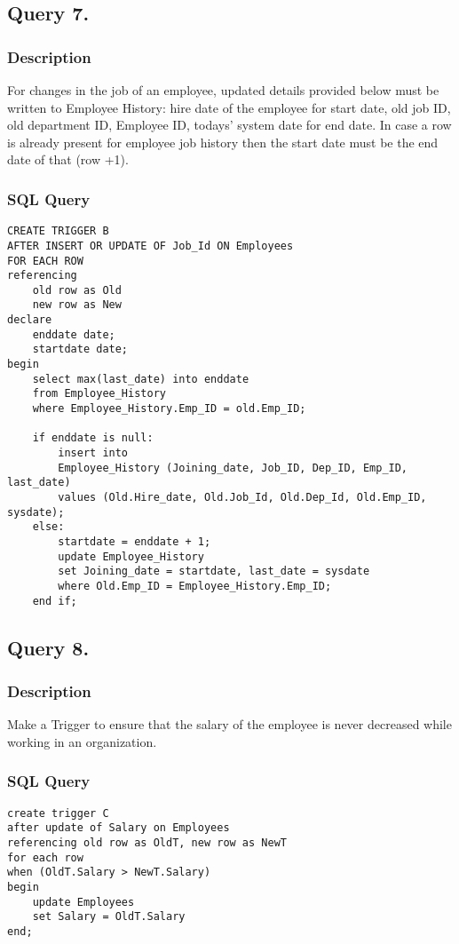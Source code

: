 \documentclass[a4paper]{article}
\begin{document}
\newpage
\subsection{Query 7.}
\subsubsection{Description}
For changes in the job of an employee, updated details provided below must be
written to Employee History:
hire date of the employee for start date, old job ID, old department ID,
Employee ID, todays' system date for end date. In case a row is already
present for employee job history then the start date must be the end date of that
(row +1).
\subsubsection{SQL Query}
\begin{lstlisting}
CREATE TRIGGER B
AFTER INSERT OR UPDATE OF Job_Id ON Employees
FOR EACH ROW
referencing
    old row as Old
    new row as New
declare
    enddate date;
    startdate date;
begin
    select max(last_date) into enddate
    from Employee_History
    where Employee_History.Emp_ID = old.Emp_ID;
    
    if enddate is null:
        insert into 
        Employee_History (Joining_date, Job_ID, Dep_ID, Emp_ID, last_date) 
        values (Old.Hire_date, Old.Job_Id, Old.Dep_Id, Old.Emp_ID, sysdate);
    else:
        startdate = enddate + 1;
        update Employee_History
        set Joining_date = startdate, last_date = sysdate
        where Old.Emp_ID = Employee_History.Emp_ID;
    end if;
\end{lstlisting}

\newpage
\subsection{Query 8.}
\subsubsection{Description}
Make a Trigger to ensure that the salary of the employee is never decreased while
working in an organization.
\subsubsection{SQL Query}
\begin{lstlisting}
create trigger C
after update of Salary on Employees
referencing old row as OldT, new row as NewT
for each row
when (OldT.Salary > NewT.Salary)
begin
    update Employees
    set Salary = OldT.Salary
end;
\end{lstlisting}
\end{document}
